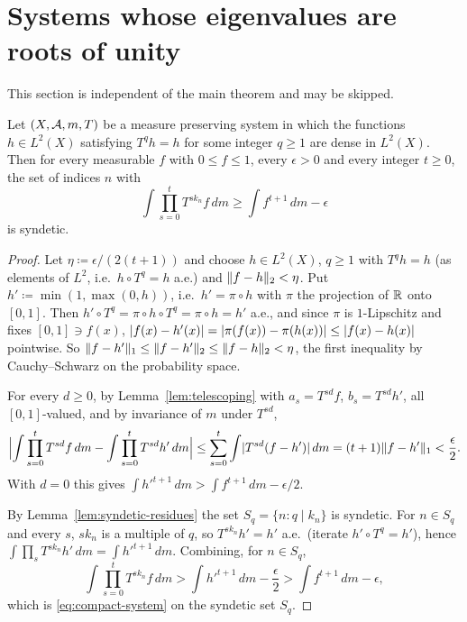 \section{Systems whose eigenvalues are roots of unity}

This section is independent of the main theorem and may be skipped.

\begin{theorem}
  \label{thm:compact-roots-of-unity}
  \leanok
  Let $(X,\mathcal{A},m,T)$ be a measure preserving system in which the functions $h \in L^2(X)$
  satisfying $T^q h = h$ for some integer $q \geq 1$ are dense in $L^2(X)$.  Then for every
  measurable $f$ with $0 \leq f \leq 1$, every $\epsilon > 0$ and every integer $t \geq 0$,
  the set of indices $n$ with
  \begin{equation}
    \label{eq:compact-system}
    \int \prod_{s=0}^{t} T^{s k_n} f \, dm \geq \int f^{t+1}\, dm - \epsilon
  \end{equation}
  is syndetic.
\end{theorem}

\begin{proof}
  \leanok
  Let $\eta \coloneqq \epsilon/(2(t+1))$ and choose $h \in L^2(X)$, $q \geq 1$ with $T^q h = h$
  (as elements of $L^2$, i.e.\ $h \circ T^q = h$ a.e.) and $\lVert f-h \rVert_2 < \eta$.  Put
  $h' \coloneqq \min(1,\max(0,h))$, i.e.\ $h' = \pi \circ h$ with $\pi$ the projection of $\mathbb{R}$
  onto $[0,1]$.  Then $h' \circ T^q = \pi \circ h \circ T^q = \pi \circ h = h'$ a.e., and since
  $\pi$ is $1$-Lipschitz and fixes $[0,1] \ni f(x)$,
  $\lvert f(x) - h'(x) \rvert = \lvert \pi(f(x)) - \pi(h(x)) \rvert \leq \lvert f(x) - h(x) \rvert$ pointwise.  So
  $\lVert f-h' \rVert_1 \leq \lVert f-h' \rVert_2 \leq \lVert f-h \rVert_2 < \eta$, the first inequality by
  Cauchy--Schwarz on the probability space.

  For every $d \geq 0$, by Lemma~\ref{lem:telescoping} with $a_s = T^{sd}f$, $b_s = T^{sd}h'$,
  all $[0,1]$-valued, and by invariance of $m$ under $T^{sd}$,
  \[
    \Bigl\lvert \int \prod_{s=0}^{t} T^{sd}f\,dm - \int \prod_{s=0}^{t} T^{sd}h'\,dm \Bigr\rvert
      \leq \sum_{s=0}^{t} \int \lvert T^{sd}(f - h') \rvert\,dm = (t+1)\lVert f-h' \rVert_1 < \frac\epsilon2 .
  \]
  With $d = 0$ this gives $\int h'^{t+1}\,dm > \int f^{t+1}\,dm - \epsilon/2$.

  By Lemma~\ref{lem:syndetic-residues} the set $S_q = \{n : q \mid k_n\}$ is syndetic.  For
  $n \in S_q$ and every $s$, $sk_n$ is a multiple of $q$, so $T^{sk_n}h' = h'$ a.e.\ (iterate
  $h' \circ T^q = h'$), hence $\int \prod_s T^{sk_n}h'\,dm = \int h'^{t+1}\,dm$.  Combining,
  for $n \in S_q$,
  \[
    \int \prod_{s=0}^{t} T^{sk_n}f\,dm > \int h'^{t+1}\,dm - \frac\epsilon2 > \int f^{t+1}\,dm - \epsilon ,
  \]
  which is \eqref{eq:compact-system} on the syndetic set $S_q$.
\end{proof}
